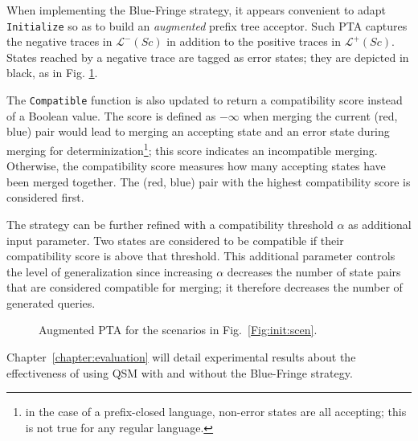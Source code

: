 When implementing the Blue-Fringe strategy, it appears convenient to adapt \texttt{Initialize} so as to build an \emph{augmented} prefix tree acceptor. Such PTA captures the negative traces in $\mathcal{L}^-(Sc)$ in addition to the positive traces in $\mathcal{L}^+(Sc)$. States reached by a negative trace are tagged as error states; they are depicted in black, as in Fig. \ref{figure:augmented-pta}. 

The \texttt{Compatible} function is also updated to return a compatibility score instead of a Boolean value. The score is defined as $-\infty$ when merging the current (red, blue) pair would lead to merging an accepting state and an error state during merging for determinization\footnote{in the case of a prefix-closed language, non-error states are all accepting; this is not true for any regular language.}; this score indicates an incompatible merging. Otherwise, the compatibility score measures how many accepting states have been merged together. The (red, blue) pair with the highest compatibility score is considered first. 

The strategy can be further refined with a compatibility threshold $\alpha$ as additional input parameter. Two states are considered to be compatible if their compatibility score is above that threshold. This additional parameter controls the level of generalization since increasing $\alpha$ decreases the number of state pairs that are considered compatible for merging; it therefore decreases the number of generated queries.

\begin{figure}\centering
{}
\caption{Augmented PTA for the scenarios in Fig.~\ref{Fig:init:scen}\label{figure:augmented-pta}.}
\end{figure}

Chapter~\ref{chapter:evaluation} will detail experimental results about the effectiveness of using QSM with and without the Blue-Fringe strategy.
